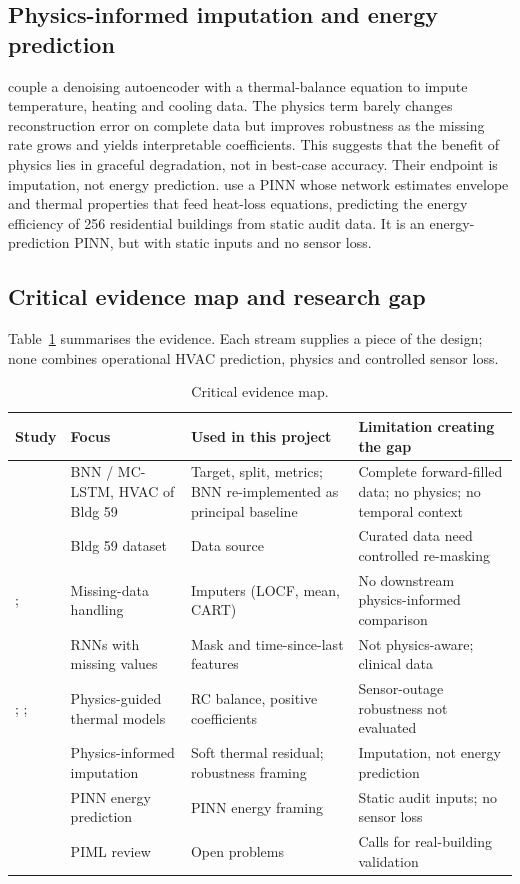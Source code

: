 \subsection{Physics-informed imputation and energy prediction}
\citet{liguori2024opening} couple a denoising autoencoder with a thermal-balance equation to impute temperature, heating and cooling data. The physics term barely changes reconstruction error on complete data but improves robustness as the missing rate grows and yields interpretable coefficients. This suggests that the benefit of physics lies in graceful degradation, not in best-case accuracy. Their endpoint is imputation, not energy prediction. \citet{michalakopoulos2024pinn} use a PINN whose network estimates envelope and thermal properties that feed heat-loss equations, predicting the energy efficiency of 256 residential buildings from static audit data. It is an energy-prediction PINN, but with static inputs and no sensor loss.

\subsection{Critical evidence map and research gap}\label{sec:gap}
Table~\ref{tab:evidence} summarises the evidence. Each stream supplies a piece of the design; none combines operational HVAC prediction, physics and controlled sensor loss.

\begin{table}[H]
\centering\small
\caption{Critical evidence map.}\label{tab:evidence}
\begin{tabular}{p{3.3cm}p{3.1cm}p{3.6cm}p{4.2cm}}
\toprule
Study & Focus & Used in this project & Limitation creating the gap \\
\midrule
\citet{mahajan2024bnn} & BNN / MC-LSTM, HVAC of Bldg 59 & Target, split, metrics; BNN re-implemented as principal baseline & Complete forward-filled data; no physics; no temporal context \\
\citet{luo2022dataset} & Bldg 59 dataset & Data source & Curated data need controlled re-masking \\
\citet{kim2023imputation}; \citet{lee2024missing} & Missing-data handling & Imputers (LOCF, mean, CART) & No downstream physics-informed comparison \\
\citet{che2018grud} & RNNs with missing values & Mask and time-since-last features & Not physics-aware; clinical data \\
\citet{gokhale2022pinn}; \citet{dinatale2022pcnn}; \citet{chen2023physcon} & Physics-guided thermal models & RC balance, positive coefficients & Sensor-outage robustness not evaluated \\
\citet{liguori2024opening} & Physics-informed imputation & Soft thermal residual; robustness framing & Imputation, not energy prediction \\
\citet{michalakopoulos2024pinn} & PINN energy prediction & PINN energy framing & Static audit inputs; no sensor loss \\
\citet{ma2025review} & PIML review & Open problems & Calls for real-building validation \\
\bottomrule
\end{tabular}
\end{table}

